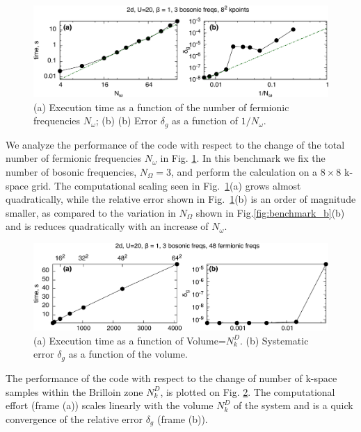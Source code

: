 \documentclass[3p,times,procedia]{elsarticle}
\begin{document}
\begin{figure}[ht]
\includegraphics[width=1.0\columnwidth]{time_ffreqs.pdf}
\caption{(a) Execution time as a function of the number of fermionic frequencies $N_{\omega}$; (b) (b) Error $\delta_g$ as a function of $1/N_{\omega}$.}
\label{fig:benchmark_f}
\end{figure}

We analyze the performance of the code with respect to the change of the total number of fermionic frequencies $N_{\omega}$  in Fig. \ref{fig:benchmark_f}.  In this benchmark we fix the number of bosonic frequencies, $N_{\Omega}=3$, and perform the calculation on a $8\times8$ k-space grid. The computational scaling seen in Fig.~\ref{fig:benchmark_f}(a) grows almost quadratically, while the relative error shown in Fig.~\ref{fig:benchmark_f}(b) is an order of magnitude smaller, as compared to the variation in $N_{\Omega}$ shown in Fig.\ref{fig:benchmark_b}(b) and is reduces quadratically with an increase of $N_{\omega}$.

\begin{figure}[ht]
\includegraphics[width=1.0\columnwidth]{time_kpts.pdf}
\caption{(a) Execution time as a function of Volume=$N_k^D$. (b) Systematic error $\delta_g$ as a function of the volume.}
\label{fig:benchmark_kpts}
\end{figure}

The performance of the code with respect to the change of number of k-space samples within the Brilloin zone $N_k^D$, is plotted on Fig. \ref{fig:benchmark_kpts}. The computational effort (frame (a)) scales linearly with the volume $N_k^D$ of the system and is a quick convergence of the relative error $\delta_g$ (frame (b)).
\end{document}
